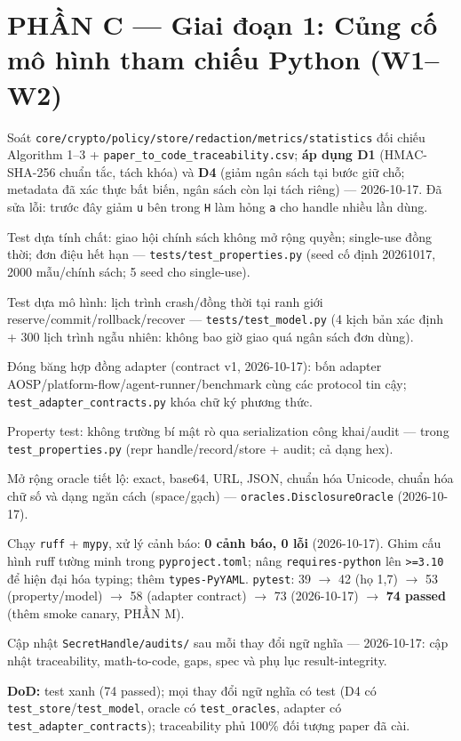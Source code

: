 \documentclass[11pt,a4paper]{article}
\newcommand{\done}{\textcolor{shgreen}{$\blacksquare$}}
\newcommand{\code}[1]{\texttt{\small #1}}
\begin{document}
\section*{PHẦN C --- Giai đoạn 1: Củng cố mô hình tham chiếu Python (W1--W2)}
\begin{chk}
\item[\done] Soát \code{core/crypto/policy/store/redaction/metrics/statistics} đối chiếu Algorithm 1--3 + \code{paper\_to\_code\_traceability.csv}; \textbf{áp dụng D1} (HMAC-SHA-256 chuẩn tắc, tách khóa) và \textbf{D4} (giảm ngân sách tại bước giữ chỗ; metadata đã xác thực bất biến, ngân sách còn lại tách riêng) --- 2026-10-17. Đã sửa lỗi: trước đây giảm \code{u} bên trong \code{H} làm hỏng \code{a} cho handle nhiều lần dùng.
\item[\done] Test dựa tính chất: giao hội chính sách không mở rộng quyền; single-use đồng thời; đơn điệu hết hạn --- \code{tests/test\_properties.py} (seed cố định 20261017, 2000 mẫu/chính sách; 5 seed cho single-use).
\item[\done] Test dựa mô hình: lịch trình crash/đồng thời tại ranh giới reserve/commit/rollback/recover --- \code{tests/test\_model.py} (4 kịch bản xác định + 300 lịch trình ngẫu nhiên: không bao giờ giao quá ngân sách đơn dùng).
\item[\done] Đóng băng hợp đồng adapter (contract v1, 2026-10-17): bốn adapter AOSP/platform-flow/agent-runner/benchmark cùng các protocol tin cậy; \code{test\_adapter\_contracts.py} khóa chữ ký phương thức.
\item[\done] Property test: không trường bí mật rò qua serialization công khai/audit --- trong \code{test\_properties.py} (repr handle/record/store + audit; cả dạng hex).
\item[\done] Mở rộng oracle tiết lộ: exact, base64, URL, JSON, chuẩn hóa Unicode, chuẩn hóa chữ số và dạng ngăn cách (space/gạch) --- \code{oracles.DisclosureOracle} (2026-10-17).
\item[\done] Chạy \code{ruff} + \code{mypy}, xử lý cảnh báo: \textbf{0 cảnh báo, 0 lỗi} (2026-10-17). Ghim cấu hình ruff tường minh trong \code{pyproject.toml}; nâng \code{requires-python} lên \code{>=3.10} để hiện đại hóa typing; thêm \code{types-PyYAML}. \code{pytest}: 39 $\to$ 42 (họ 1,7) $\to$ 53 (property/model) $\to$ 58 (adapter contract) $\to$ 73 (2026-10-17) $\to$ \textbf{74 passed} (thêm smoke canary, PHẦN M).
\item[\done] Cập nhật \code{SecretHandle/audits/} sau mỗi thay đổi ngữ nghĩa --- 2026-10-17: cập nhật traceability, math-to-code, gaps, spec và phụ lục result-integrity.
\item[\done] \textbf{DoD:} test xanh (74 passed); mọi thay đổi ngữ nghĩa có test (D4 có \code{test\_store}/\code{test\_model}, oracle có \code{test\_oracles}, adapter có \code{test\_adapter\_contracts}); traceability phủ 100\% đối tượng paper đã cài.
\end{chk}
\end{document}
